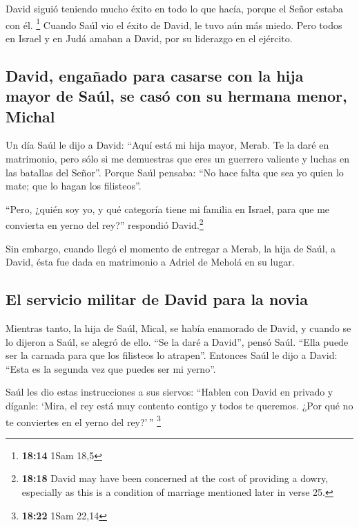  David siguió teniendo mucho éxito en todo lo que hacía,
porque el Señor estaba con él. \footnote{\textbf{18:14} 1Sam 18,5}
 Cuando Saúl vio el éxito de David, le tuvo aún más
miedo.  Pero todos en Israel y en Judá amaban a David,
por su liderazgo en el ejército.

\hypertarget{david-engauxf1ado-para-casarse-con-la-hija-mayor-de-sauxfal-se-casuxf3-con-su-hermana-menor-michal}{%
\subsection{David, engañado para casarse con la hija mayor de Saúl, se
casó con su hermana menor,
Michal}\label{david-engauxf1ado-para-casarse-con-la-hija-mayor-de-sauxfal-se-casuxf3-con-su-hermana-menor-michal}}

 Un día Saúl le dijo a David: ``Aquí está mi hija mayor,
Merab. Te la daré en matrimonio, pero sólo si me demuestras que eres un
guerrero valiente y luchas en las batallas del Señor''. Porque Saúl
pensaba: ``No hace falta que sea yo quien lo mate; que lo hagan los
filisteos''.

 ``Pero, ¿quién soy yo, y qué categoría tiene mi familia
en Israel, para que me convierta en yerno del rey?'' respondió
David.\footnote{\textbf{18:18} David may have been concerned at the cost
  of providing a dowry, especially as this is a condition of marriage
  mentioned later in verse 25.}

 Sin embargo, cuando llegó el momento de entregar a
Merab, la hija de Saúl, a David, ésta fue dada en matrimonio a Adriel de
Meholá en su lugar.

\hypertarget{el-servicio-militar-de-david-para-la-novia}{%
\subsection{El servicio militar de David para la
novia}\label{el-servicio-militar-de-david-para-la-novia}}

 Mientras tanto, la hija de Saúl, Mical, se había
enamorado de David, y cuando se lo dijeron a Saúl, se alegró de ello.
 ``Se la daré a David'', pensó Saúl. ``Ella puede ser la
carnada para que los filisteos lo atrapen''. Entonces Saúl le dijo a
David: ``Esta es la segunda vez que puedes ser mi yerno''.

 Saúl les dio estas instrucciones a sus siervos: ``Hablen
con David en privado y díganle: `Mira, el rey está muy contento contigo
y todos te queremos. ¿Por qué no te conviertes en el yerno del rey?'\,''
\footnote{\textbf{18:22} 1Sam 22,14}

